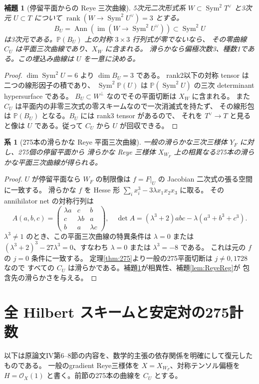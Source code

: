 \documentclass[11pt,a4paper]{ltjsarticle}
\newtheorem{lemma}[theorem]{補題}
\newtheorem{corollary}[theorem]{系}
\newcommand{\PP}{\mathbb P}
\newcommand{\OO}{\mathcal O}
\newcommand{\Sym}{\operatorname{Sym}}
\newcommand{\rk}{\operatorname{rank}}
\newcommand{\Ann}{\operatorname{Ann}}
\begin{document}
\begin{lemma}[停留平面からの Reye 三次曲線]\label{lem:CU}
5次元二次形式系 $W\subset\Sym^2T^\vee$ と3次元 $U\subset T$ について
$\rk(W\to\Sym^2U^\vee)=3$ とする。
\[
 B_U=\Ann(\operatorname{im}(W\to\Sym^2U^\vee))\subset\Sym^2U
\]
は3次元である。$\PP(B_U)$ 上の対称 $3\times3$ 行列式が零でないなら、
その零曲線 $C_U$ は平面三次曲線であり、$X_W$ に含まれる。
滑らかなら偏極次数3、種数1である。この埋込み曲線は $U$ を一意に決める。
\end{lemma}
\begin{proof}
$\dim\Sym^2U=6$ より $\dim B_U=3$ である。
rank2以下の対称 tensor は二つの線形因子の積であり、
$\Sym^2\PP(U)$ は $\PP(\Sym^2U)$ の三次 determinant hypersurface である。
$B_U\subset W^\perp$ なのでその平面切断は $X_W$ に含まれる。
また $C_U$ は平面内の非零三次式の零スキームなので一次消滅式を持たず、
その線形包は $\PP(B_U)$ となる。$B_U$ には rank3 tensor があるので、
それを $T^\vee\to T$ と見ると像は $U$ である。従って $C_U$ から $U$ が回収できる。
\end{proof}

\begin{corollary}[275本の滑らかな Reye 平面三次曲線]\label{cor:275CU}
一般の滑らかな三次三様体 $Y_F$ に対し、275個の停留平面から
滑らかな Reye 三様体 $X_{W_F}$ 上の相異なる275本の滑らかな平面三次曲線が得られる。
\end{corollary}
\begin{proof}
$U$ が停留平面なら $W_F$ の制限像は $f=F|_U$ の Jacobian 二次式の張る空間に一致する。
滑らかな $f$ を Hesse 形 $\sum_i x_i^3-3\lambda x_1x_2x_3$ に取る。
その annihilator net の対称行列は
\[
 A(a,b,c)=\begin{pmatrix}\lambda a&c&b\\c&\lambda b&a\\b&a&\lambda c\end{pmatrix},
\quad \det A=(\lambda^3+2)abc-\lambda(a^3+b^3+c^3).
\]
$\lambda^3\ne1$ のとき、この平面三次曲線の特異条件は
$\lambda=0$ または $(\lambda^3+2)^3-27\lambda^3=0$、すなわち
$\lambda=0$ または $\lambda^3=-8$ である。
これは元の $f$ の $j=0$ 条件に一致する。
定理\ref{thm:275}より一般の275平面切断は $j\ne0,1728$ なので
すべての $C_U$ は滑らかである。補題\ref{lem:CU}が相異性、補題\ref{lem:ReyeReg}が
包含先の滑らかさを与える。
\end{proof}


\section{全 Hilbert スキームと安定対の275計数}
以下は原論文IV第6--8節の内容を、数学的主張の依存関係を明確にして復元したものである。
一般のgradient Reye三様体を $X=X_{W_F}$、対称テンソル偏極を
$H=\OO_X(1)$ と書く。前節の275本の曲線を $C_U$ とする。
\end{document}
